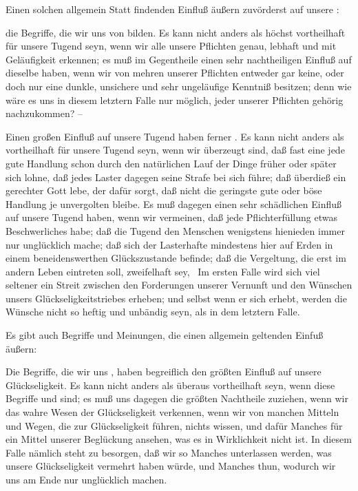 \begin{aufza}
\item Einen solchen allgemein Statt findenden Einfluß äußern zuvörderst auf unsere :
\begin{aufzb}
\item die Begriffe, die wir uns von  bilden. Es kann nicht anders als höchst vortheilhaft für unsere Tugend seyn, wenn wir alle unsere Pflichten genau, lebhaft und mit Geläufigkeit erkennen; es muß im Gegentheile einen sehr nachtheiligen Einfluß auf dieselbe haben, wenn wir von mehren unserer Pflichten entweder gar keine, oder doch nur eine dunkle, unsichere und sehr ungeläufige Kenntniß besitzen; denn wie wäre es uns in diesem letztern Falle nur möglich, jeder unserer Pflichten gehörig nachzukommen? --
\item Einen großen Einfluß auf unsere Tugend haben ferner . Es kann nicht anders als vortheilhaft für unsere Tugend seyn, wenn wir überzeugt sind, daß fast eine jede gute Handlung schon durch den natürlichen Lauf der Dinge früher oder später sich lohne, daß jedes Laster dagegen seine Strafe bei sich führe; daß überdieß ein gerechter Gott lebe, der dafür sorgt, daß nicht die geringste gute oder böse Handlung je unvergolten bleibe. Es muß dagegen einen sehr schädlichen Einfluß auf unsere Tugend haben, wenn wir vermeinen, daß jede Pflichterfüllung etwas Beschwerliches habe; daß die Tugend den Menschen wenigstens hienieden immer nur unglücklich mache; daß sich der Lasterhafte mindestens hier auf Erden in einem beneidenswerthen Glückszustande befinde; daß die Vergeltung, die erst im andern Leben eintreten soll, zweifelhaft sey, \usw\ Im ersten Falle wird sich viel seltener ein Streit zwischen den Forderungen unserer Vernunft und den Wünschen unsers Glückseligkeitstriebes erheben; und selbst wenn er sich erhebt, werden die Wünsche nicht so heftig und unbändig seyn, als in dem letztern Falle.
\end{aufzb}
\item Es gibt auch Begriffe und Meinungen, die  einen allgemein geltenden Einfuß äußern:
\begin{aufzb}
\item Die Begriffe, die wir uns , haben begreiflich den größten Einfluß auf unsere Glückseligkeit. Es kann nicht anders als überaus vortheilhaft seyn, wenn diese Begriffe  und  sind; es muß uns dagegen die größten Nachtheile zuziehen, wenn wir das wahre Wesen der Glückseligkeit verkennen, wenn wir von manchen Mitteln und Wegen, die zur Glückseligkeit führen, nichts wissen, und dafür Manches für ein Mittel unserer Beglückung ansehen, was es in Wirklichkeit nicht ist. In diesem Falle nämlich steht zu besorgen, daß wir so Manches unterlassen werden, was unsere Glückseligkeit vermehrt haben würde, und Manches thun, wodurch wir uns am Ende nur unglücklich machen.

\end{aufzb}
\end{aufza}
